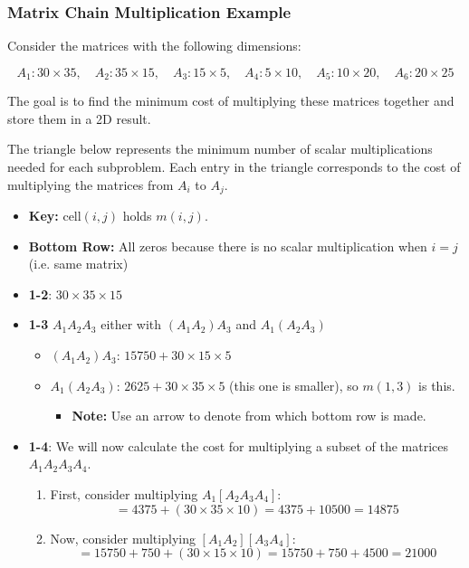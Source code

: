 \subsubsection{Matrix Chain Multiplication Example}
\begin{example}
    Consider the matrices with the following dimensions:

    \[
    A_1: 30 \times 35, \quad A_2: 35 \times 15, \quad A_3: 15 \times 5, \quad A_4: 5 \times 10, \quad A_5: 10 \times 20, \quad A_6: 20 \times 25
    \]

    The goal is to find the minimum cost of multiplying these matrices together and store them in a 2D result.
    \vspace{1em}

    The triangle below represents the minimum number of scalar multiplications needed for each subproblem. Each entry in the triangle corresponds to the cost of multiplying the matrices from \(A_i\) to \(A_j\). 

    \begin{itemize}
        \item \textbf{Key:} $\text{cell}(i,j)$ holds $m(i,j)$.
        \item \textbf{Bottom Row:} All zeros because there is no scalar multiplication when $i=j$ (i.e. same matrix)
        \item \textbf{1-2}: $30 \times 35 \times 15$
        \item \textbf{1-3} $A_1 A_2 A_3$ either with $(A_1 A_2)A_3$ and $A_1 (A_2A_3)$
        \begin{itemize}
            \item $(A_1 A_2)A_3$: $15750 + 30 \times 15 \times 5$
            \item $A_1 (A_2A_3)$: $2625 + 30 \times 35 \times 5$ (this one is smaller), so $m(1,3)$ is this. 
            \begin{itemize}
                \item \textbf{Note:} Use an arrow to denote from which bottom row is made.  
            \end{itemize}
        \end{itemize}
        \item \textbf{1-4}: We will now calculate the cost for multiplying a subset of the matrices $A_1 A_2 A_3 A_4$.
        \begin{enumerate}
            \item First, consider multiplying \(A_1[A_2 A_3 A_4]\):
            \[
            = 4375 + (30 \times 35 \times 10) = 4375 + 10500 = 14875
            \]
            \item Now, consider multiplying \([A_1 A_2][A_3 A_4]\):
            \[
            = 15750 + 750 + (30 \times 15 \times 10) = 15750 + 750 + 4500 = 21000
            \]
        

\end{enumerate}
\end{itemize}
\end{example}
